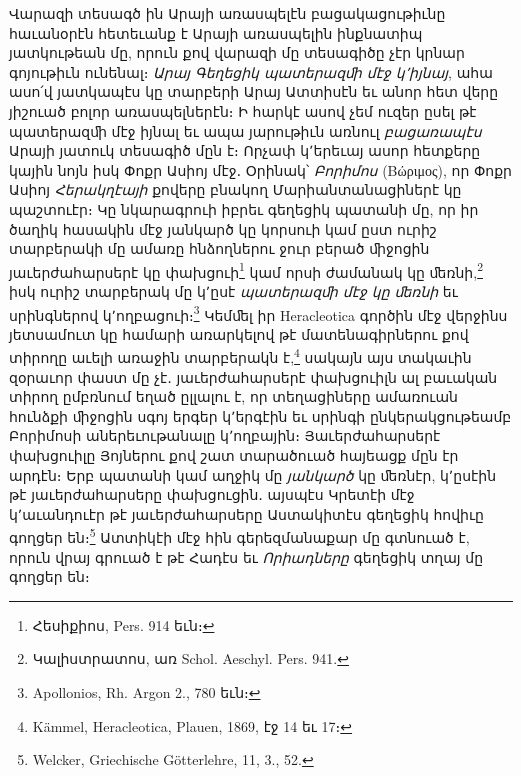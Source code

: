 \documentclass{article}
\begin{document}
{Վարազի տեսագծ ին Արայի առասպելէն բացակացութիւնը հաւանօրէն հետեւանք է Արայի առասպելին ինքնատիպ յատկութեան մը, որուն քով վարազի մը տեսագիծը չէր կրնար գոյութիւն ունենալ։ \emph{Արայ Գեղեցիկ պատերազﬕ մէջ կ՚իյնայ}, ահա ասո՛վ յատկապէս կը տարբերի Արայ Ատտիսէն եւ անոր հետ վերը յիշուած բոլոր առասպելներէն։ Ի հարկէ ասով չեմ ուզեր ըսել թէ պատերազﬕ մէջ իյնալ եւ ապա յարութիւն առնուլ \emph{բացառապէս} Արայի յատուկ տեսագիծ մըն է։ Որչափ կ՚երեւայ ասոր հետքերը կային նոյն իսկ Փոքր Ասիոյ մէջ․ Օրինակ՝ \emph{Բորիմոս} (Βώριμος), որ Փոքր Ասիոյ \emph{Հերակղէայի} քովերը բնակող Մարիանտանացիներէ կը պաշտուէր։ Կը նկարագրուի իբրեւ գեղեցիկ պատանի մը, որ իր ծաղիկ հասակին մէջ յանկարծ կը կորսուի կամ ըստ ուրիշ տարբերակի մը ամառը հնձողներու ջուր բերած ﬕջոցին յաւերժահարսերէ կը փախցուի\footnote{Հեսիքիոս, Pers. 914 եւն։} կամ որսի ժամանակ կը ﬔռնի,\footnote{Կալիստրատոս, առ Schol. Aeschyl. Pers. 941.} իսկ ուրիշ տարբերակ մը կ՚ըսէ \emph{պատերազﬕ մէջ կը ﬔռնի} եւ սրինգներով կ՚ողբացուի։\footnote{Apollonios, Rh. Argon 2., 780 եւն։} Կեմﬔլ իր Heracleotica գործին մէջ վերջինս յետսամուտ կը համարի առարկելով թէ մատենագիրներու քով տիրողը աւելի առաջին տարբերակն է,\footnote{Kämmel, Heracleotica, Plauen, 1869, էջ 14 եւ 17։} սակայն այս տակաւին զօրաւոր փաստ մը չէ․ յաւերժահարսերէ փախցուիլն ալ բաւական տիրող ըմբռնում եղած ըլլալու է, որ տեղացիները ամառուան հունձքի ﬕջոցին սգոյ երգեր կ՚երգէին եւ սրինգի ընկերակցութեամբ Բորիմոսի աներեւութանալը կ՚ողբային։ Յաւերժահարսերէ փախցուիլը Յոյներու քով շատ տարածուած հայեացք մըն էր արդէն։ Երբ պատանի կամ աղջիկ մը \emph{յանկարծ} կը ﬔռնէր, կ՚ըսէին թէ յաւերժահարսերը փախցուցին․ այսպէս Կրետէի մէջ կ՚աւանդուէր թէ յաւերժահարսերը Աստակիտէս գեղեցիկ հովիւը գողցեր են։\footnote{Welcker, Griechische Götterlehre, 11, 3., 52.} Ատտիկէի մէջ հին գերեզմանաքար մը գտնուած է, որուն վրայ գրուած է թէ Հադէս եւ \emph{Որիադները} գեղեցիկ տղայ մը գողցեր են։

}
\end{document}
